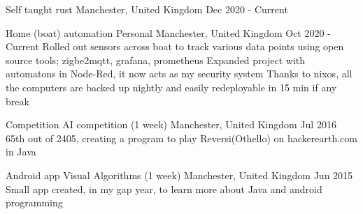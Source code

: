 \documentclass{my_cv}
\begin{document}
\experianceDetails
{Self taught}
{rust}
{}
{Manchester, United Kingdom}
{Dec 2020 - Current}
\workdetails
{}
\stopworkdetails


\experianceDetails
{Home (boat) automation}
{Personal}
{}
{Manchester, United Kingdom}
{Oct 2020 - Current}
\workdetails
{Rolled out sensors across boat to track various data points using open source tools; zigbe2mqtt, grafana, prometheus}
{Expanded project with automatons in Node-Red, it now acts as my security system}
{Thanks to nixos, all the computers are backed up nightly and easily redeployable in 15 min if any break}
\stopworkdetails






\experianceDetails
{Competition}
{AI competition}
{(1 week)}
{Manchester, United Kingdom}
{Jul 2016}
\workdetails
{65th out of 2405, creating a program to play Reversi(Othello) on hackerearth.com in Java}
\stopworkdetails

\experianceDetails
{Android app}
{Visual Algorithms}
{(1 week)}
{Manchester, United Kingdom}
{Jun 2015}
\workdetails
{Small app created, in my gap year, to learn more about Java and android programming}
\stopworkdetails
\end{document}
